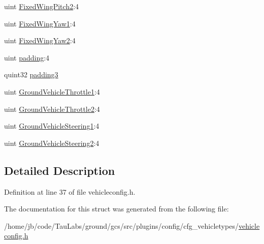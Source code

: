 \begin{DoxyCompactItemize}
\item 
uint \hyperlink{group___config_plugin_gaeef8404a3e1d41f57ce18b8e9b351a2d}{\-Fixed\-Wing\-Pitch2}\-:4
\item 
uint \hyperlink{group___config_plugin_ga8282dac2550d491034ca0e0fa8f09c0d}{\-Fixed\-Wing\-Yaw1}\-:4
\item 
uint \hyperlink{group___config_plugin_ga0f87bb28c2fe43ab7616b7322ac21106}{\-Fixed\-Wing\-Yaw2}\-:4
\item 
uint \hyperlink{group___config_plugin_gae439ab85c005f3400498997049fd50e8}{padding}\-:4
\item 
quint32 \hyperlink{group___config_plugin_gae95d6e80e1c87598f33d4be1b0a8c410}{padding3}
\item 
uint \hyperlink{group___config_plugin_ga755435654b7373fe879e991ccdd40757}{\-Ground\-Vehicle\-Throttle1}\-:4
\item 
uint \hyperlink{group___config_plugin_ga6a8ae4214756c689b83b9f42a56c2505}{\-Ground\-Vehicle\-Throttle2}\-:4
\item 
uint \hyperlink{group___config_plugin_gad4fe3d4d30764b30210253be62bb0974}{\-Ground\-Vehicle\-Steering1}\-:4
\item 
uint \hyperlink{group___config_plugin_gab404016de72261d048356e628b9ef0b7}{\-Ground\-Vehicle\-Steering2}\-:4
\end{DoxyCompactItemize}


\subsection{\-Detailed \-Description}


\-Definition at line 37 of file vehicleconfig.\-h.



\-The documentation for this struct was generated from the following file\-:\begin{DoxyCompactItemize}
\item 
/home/jb/code/\-Tau\-Labs/ground/gcs/src/plugins/config/cfg\-\_\-vehicletypes/\hyperlink{vehicleconfig_8h}{vehicleconfig.\-h}\end{DoxyCompactItemize}
